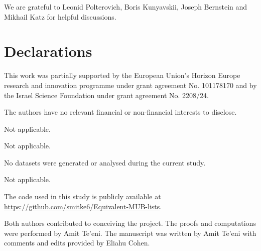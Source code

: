 \documentclass[referee,sn-mathphys-num]{sn-jnl}%
\theoremstyle{thmstyleone}%
\theoremstyle{thmstyletwo}%
\theoremstyle{remark}
\theoremstyle{thmstylethree}%
\begin{document}
We are grateful to Leonid Polterovich, Boris Kunyavskii, Joseph Bernstein and Mikhail Katz for helpful discussions.

\section*{Declarations}
This work was partially supported by the European Union's Horizon Europe research and innovation programme under grant agreement No. 101178170 and by the Israel Science Foundation under grant agreement No. 2208/24.

The authors have no relevant financial or non-financial interests to disclose.

Not applicable.

Not applicable.

No datasets were generated or analysed during the current study.

Not applicable.

The code used in this study is publicly available at \url{https://github.com/smitke6/Equivalent-MUB-lists}.

Both authors contributed to conceiving the project. The proofs and computations were performed by Amit Te'eni. The manuscript was written by Amit Te'eni with comments and edits provided by Eliahu Cohen.

\begin{appendices}




\end{appendices}
\end{document}
